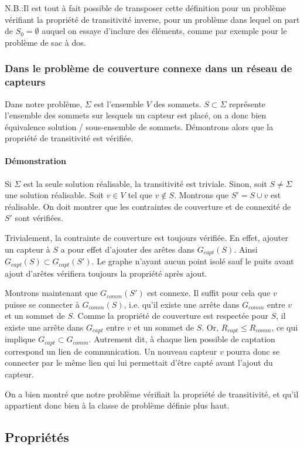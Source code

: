\documentclass[12pt,a4paper]{article}
\begin{document}
N.B.:Il est tout à fait possible de transposer cette définition pour un problème vérifiant la propriété de transitivité inverse, pour un problème dans lequel on part de $S_0=\emptyset$ auquel on essaye d'inclure des éléments, comme par exemple pour le problème de sac à dos.

\subsubsection{Dans le problème de couverture connexe dans un réseau de capteurs}
Dans notre problème, $\Sigma$ est l'ensemble $V$ des sommets. $S\subset \Sigma$ représente l'ensemble des sommets sur lesquels un capteur est placé, on a donc bien équivalence solution / sous-ensemble de sommets. Démontrons alors que la propriété de transitivité est vérifiée.
\paragraph{Démonstration}
Si $\Sigma$ est la seule solution réalisable, la transitivité est triviale. Sinon, soit $S\neq \Sigma$ une solution réalisable. Soit $v \in V$ tel que $v\notin   S$. Montrons que $S'=S\cup v$ est réalisable. On doit montrer que les contraintes de couverture et de connexité de $S'$ sont vérifiées.

Trivialement, la contrainte de couverture est toujours vérifiée. En effet, ajouter un capteur à $S$ a pour effet d'ajouter des arêtes dans $G_{capt}(S)$. Ainsi $G_{capt}(S)\subset G_{capt}(S')$. Le graphe n'ayant aucun point isolé sauf le puits avant ajout d'arêtes vérifiera toujours la propriété après ajout. 

Montrons maintenant que $G_{comm}(S')$ est connexe. Il suffit pour cela que $v$ puisse se connecter à $G_{comm}(S)$, i.e. qu'il existe une arrête dans $G_{comm}$ entre $v$ et un sommet de $S$. Comme la propriété de couverture est respectée pour $S$, il existe une arrête dans $G_{capt}$ entre $v$ et un sommet de $S$. Or, $R_{capt}\leq R_{comm}$, ce qui implique $G_{capt}\subset G_{comm}$. Autrement dit, à chaque lien possible de captation correspond un lien de communication. Un nouveau capteur $v$ pourra donc se connecter par le même lien qui lui permettait d'être capté avant l'ajout du capteur.

On a bien montré que notre problème vérifiait la propriété de transitivité, et qu'il appartient donc bien à la classe de problème définie plus haut.

\subsection{Propriétés}
\end{document}

